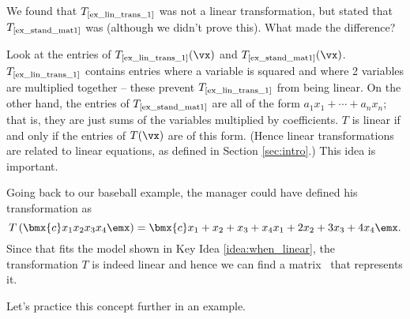 We found that $T_{\text{\scriptsize\ref{ex_lin_trans_1}}}$ was not a linear transformation, but stated that $T_{\text{\scriptsize\ref{ex_stand_mat1}}}$ was (although we didn't prove this). What made the difference? 

Look at the entries of $T_{\text{\scriptsize\ref{ex_lin_trans_1}}}(\vx)$ and $T_{\text{\scriptsize\ref{ex_stand_mat1}}}(\vx)$. $T_{\text{\scriptsize\ref{ex_lin_trans_1}}}$ contains entries where a variable is squared and where 2 variables are multiplied together -- these prevent $T_{\text{\scriptsize\ref{ex_lin_trans_1}}}$ from being linear. On the other hand, the entries of $T_{\text{\scriptsize\ref{ex_stand_mat1}}}$ are all of the form $a_1x_1 + \cdots + a_nx_n$; that is, they are just sums of the variables multiplied by coefficients. $T$ is linear if and only if the entries of $T(\vx)$ are of this form. (Hence linear transformations are related to linear equations, as defined in Section \ref{sec:intro}.) This idea is important.

\smallskip


\smallskip

Going back to our baseball example, the manager could have defined his transformation as 
\[
T\left(\bmx{c}x_1\\x_2\\x_3\\x_4\emx\right) = \bmx{c}x_1+x_2+x_3+x_4 \\ x_1+2x_2+3x_3+4x_4\emx.
\]
Since that fits the model shown in Key Idea \ref{idea:when_linear}, the transformation $T$ is indeed linear and hence we can find a matrix \TT\ that represents it.

Let's practice this concept further in an example.

\medskip

